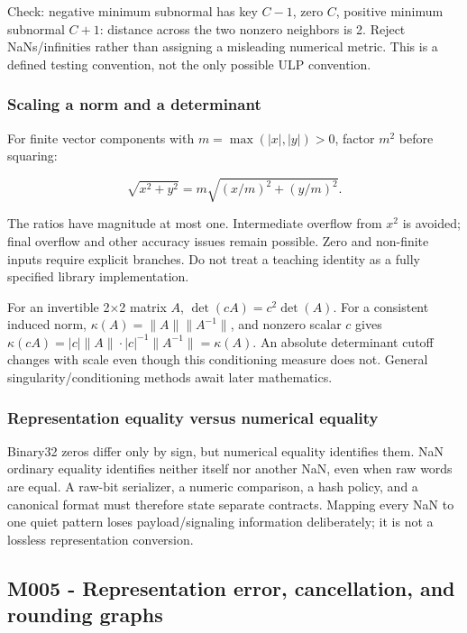 Check: negative minimum subnormal has key \(C-1\), zero \(C\), positive minimum subnormal \(C+1\): distance across the two nonzero neighbors is 2. Reject NaNs/infinities rather than assigning a misleading numerical metric. This is a defined testing convention, not the only possible ULP convention.

\subsubsection{Scaling a norm and a determinant}\label{scaling-a-norm-and-a-determinant}

For finite vector components with \(m=\max(|x|,|y|)>0\), factor \(m^2\) before squaring:

\[
\sqrt{x^2+y^2}=m\sqrt{(x/m)^2+(y/m)^2}.
\]

The ratios have magnitude at most one. Intermediate overflow from \(x^2\) is avoided; final overflow and other accuracy issues remain possible. Zero and non-finite inputs require explicit branches. Do not treat a teaching identity as a fully specified library implementation.

For an invertible 2×2 matrix \(A\), \(\det(cA)=c^2\det(A)\). For a consistent induced norm, \(\kappa(A)=\|A\|\|A^{-1}\|\), and nonzero scalar \(c\) gives \(\kappa(cA)=|c|\|A\|\cdot|c|^{-1}\|A^{-1}\|=\kappa(A)\). An absolute determinant cutoff changes with scale even though this conditioning measure does not. General singularity/conditioning methods await later mathematics.

\subsubsection{Representation equality versus numerical equality}\label{representation-equality-versus-numerical-equality}

Binary32 zeros differ only by sign, but numerical equality identifies them. NaN ordinary equality identifies neither itself nor another NaN, even when raw words are equal. A raw-bit serializer, a numeric comparison, a hash policy, and a canonical format must therefore state separate contracts. Mapping every NaN to one quiet pattern loses payload/signaling information deliberately; it is not a lossless representation conversion.

\subsection{M005 - Representation error, cancellation, and rounding graphs}\label{m005---representation-error-cancellation-and-rounding-graphs}

